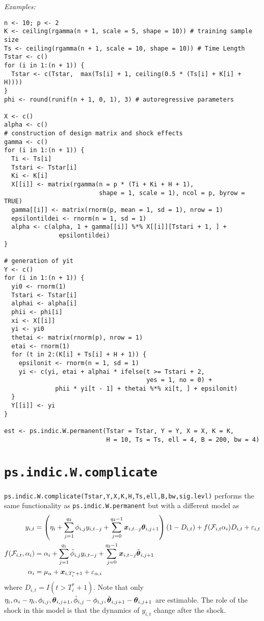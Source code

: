 \documentclass[12pt]{article}
\begin{document}
 \emph{Examples:}
 
 \begin{verbatim}
n <- 10; p <- 2
K <- ceiling(rgamma(n + 1, scale = 5, shape = 10)) # training sample size
Ts <- ceiling(rgamma(n + 1, scale = 10, shape = 10)) # Time Length
Tstar <- c()
for (i in 1:(n + 1)) {
  Tstar <- c(Tstar,  max(Ts[i] + 1, ceiling(0.5 * (Ts[i] + K[i] + H))))
}
phi <- round(runif(n + 1, 0, 1), 3) # autoregressive parameters

X <- c()
alpha <- c()
# construction of design matrix and shock effects
gamma <- c()
for (i in 1:(n + 1)) {
  Ti <- Ts[i]
  Tstari <- Tstar[i]
  Ki <- K[i]
  X[[i]] <- matrix(rgamma(n = p * (Ti + Ki + H + 1),
                          shape = 1, scale = 1), ncol = p, byrow = TRUE) 
  gamma[[i]] <- matrix(rnorm(p, mean = 1, sd = 1), nrow = 1)
  epsilontildei <- rnorm(n = 1, sd = 1)
  alpha <- c(alpha, 1 + gamma[[i]] %*% X[[i]][Tstari + 1, ] +
               epsilontildei)
}

# generation of yit
Y <- c()
for (i in 1:(n + 1)) {
  yi0 <- rnorm(1)
  Tstari <- Tstar[i]
  alphai <- alpha[i]
  phii <- phi[i]
  xi <- X[[i]]
  yi <- yi0
  thetai <- matrix(rnorm(p), nrow = 1)
  etai <- rnorm(1)
  for (t in 2:(K[i] + Ts[i] + H + 1)) {
    epsilonit <- rnorm(n = 1, sd = 1)
    yi <- c(yi, etai + alphai * ifelse(t >= Tstari + 2, 
                                       yes = 1, no = 0) +
              phii * yi[t - 1] + thetai %*% xi[t, ] + epsilonit)
  }
  Y[[i]] <- yi
}

est <- ps.indic.W.permanent(Tstar = Tstar, Y = Y, X = X, K = K, 
                            H = 10, Ts = Ts, ell = 4, B = 200, bw = 4)
 \end{verbatim}
 
 \section{\texttt{ps.indic.W.complicate}}
 
 \texttt{ps.indic.W.complicate(Tstar,Y,X,K,H,Ts,ell,B,bw,sig.levl)} performs the same functionality as  \texttt{ps.indic.W.permanent} but with a different model as 
 \begin{align*}
 	y_{i,t}
 	&= \left(\eta_i + \sum_{j=1}^{q_2} \phi_{i,j} y_{i, t-j} + \sum_{j=0}^{q_2-1} \boldsymbol{x}_{i, t-j}\boldsymbol{\theta}_{i, j + 1} \right) (1-D_{i,t}) + f(\mathcal{F}_{i, t} \alpha_i)D_{i,t} + \varepsilon_{i,t}  \\
 	f(\mathcal{F}_{i,t},\alpha_i)	 & = \alpha_i +\sum_{j=1}^{q_1} \tilde{\phi}_{i, j} y_{i, t-j} + \sum_{j=0}^{q_2-1} \boldsymbol{x}_{i, t-j} \tilde{\boldsymbol{\theta}}_{i, j +1} \\
 	\alpha_i & = \mu_{\alpha} + \boldsymbol{x}_{i, T_i^*+1} + \varepsilon_{\alpha, i}
 \end{align*}
 where $D_{i,t}=I(t > T_i^*+1)$. Note that only $\eta_i, \alpha_i - \eta_i, \phi_{i,j}, \boldsymbol{\theta}_{i, j+1}, \tilde{\phi}_{i,j}-\phi_{i,j}, \tilde{\boldsymbol{\theta}}_{i,j+1}-\boldsymbol{\theta}_{i, j+1}$ are estimable.
The role of the shock in this model is that the dynamics of $y_{i,t}$ change after the shock.
\end{document}
